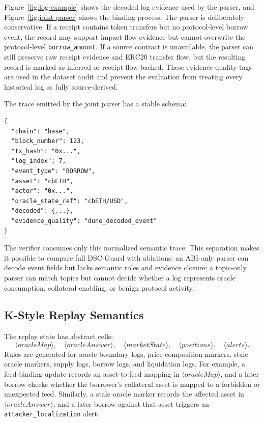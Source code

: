 \documentclass[final,5p]{elsarticle}
\newcommand{\code}[1]{\texttt{#1}}
\begin{document}
Figure~\ref{fig:log-example} shows the decoded log evidence used by the parser, and Figure~\ref{fig:joint-parser} shows the binding process.
The parser is deliberately conservative.
If a receipt contains token transfers but no protocol-level borrow event, the record may support impact-flow evidence but cannot overwrite the protocol-level \code{borrow\_amount}.
If a source contract is unavailable, the parser can still preserve raw receipt evidence and ERC20 transfer flow, but the resulting record is marked as inferred or receipt-flow-backed.
These evidence-quality tags are used in the dataset audit and prevent the evaluation from treating every historical log as fully source-derived.

The trace emitted by the joint parser has a stable schema:

\begin{lstlisting}[basicstyle=\footnotesize\ttfamily,breaklines=true]
{
  "chain": "base",
  "block_number": 123,
  "tx_hash": "0x...",
  "log_index": 7,
  "event_type": "BORROW",
  "asset": "cbETH",
  "actor": "0x...",
  "oracle_state_ref": "cbETH/USD",
  "decoded": {...},
  "evidence_quality": "dune_decoded_event"
}
\end{lstlisting}

The verifier consumes only this normalized semantic trace.
This separation makes it possible to compare full DSC-Guard with ablations: an ABI-only parser can decode event fields but lacks semantic roles and evidence closure; a topic-only parser can match topics but cannot decide whether a log represents oracle consumption, collateral enabling, or benign protocol activity.

\subsection{K-Style Replay Semantics}

The replay state has abstract cells:
\[
\langle oracleMap \rangle,\quad
\langle oracleAnswer \rangle,\quad
\langle marketState \rangle,\quad
\langle positions \rangle,\quad
\langle alerts \rangle.
\]
Rules are generated for oracle boundary logs, price-composition markers, stale oracle markers, supply logs, borrow logs, and liquidation logs.
For example, a feed-binding update records an asset-to-feed mapping in \(\langle oracleMap \rangle\), and a later borrow checks whether the borrower's collateral asset is mapped to a forbidden or unexpected feed.
Similarly, a stale oracle marker records the affected asset in \(\langle oracleAnswer \rangle\), and a later borrow against that asset triggers an \code{attacker\_localization} alert.
\end{document}
